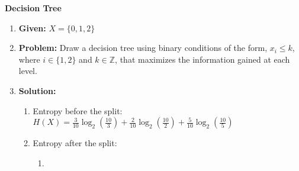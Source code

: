 \begin{example} \textbf{Decision Tree}
    \begin{enumerate}
        \item \textbf{Given:} $X= \{0,1,2\}$
        \item \textbf{Problem:} Draw a decision tree using binary conditions of the form, \(x_i \leq k\), where \(i \in \{1, 2\}\) and \(k \in \mathbb{Z}\), that maximizes the information gained at each level.
        \item \textbf{Solution:}
        \begin{enumerate}
            \item Entropy before the split: $H(X) = \frac{3}{10} \log_2\left(\frac{10}{3}\right) + \frac{2}{10} \log_2\left(\frac{10}{2}\right) + \frac{5}{10} \log_2\left(\frac{10}{5}\right)$
            \item Entropy after the split:
            \begin{enumerate}
                \item 
            \end{enumerate}
        \end{enumerate}
    \end{enumerate}
\end{example}

